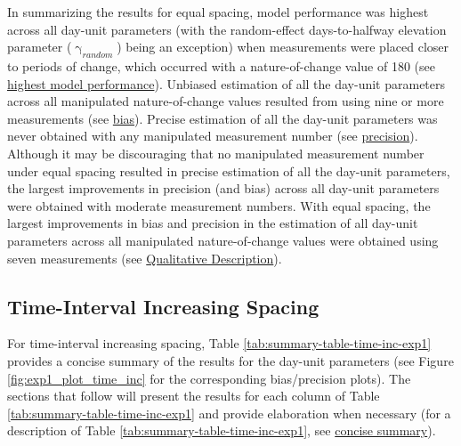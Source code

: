 \documentclass[
12pt, %
twoside,
english]{guelphthesis}
\begin{document}
In summarizing the results for equal spacing, model performance was highest across all day-unit parameters (with the random-effect days-to-halfway elevation parameter (\(\upgamma_{random}\)) being an exception) when measurements were placed closer to periods of change, which occurred with a nature-of-change value of 180 (see \protect\hyperlink{nature-change-equal-exp1}{highest model performance}). Unbiased estimation of all the day-unit parameters across all manipulated nature-of-change values resulted from using nine or more measurements (see \protect\hyperlink{bias-equal-exp1}{bias}). Precise estimation of all the day-unit parameters was never obtained with any manipulated measurement number (see \protect\hyperlink{precision-equal-exp1}{precision}). Although it may be discouraging that no manipulated measurement number under equal spacing resulted in precise estimation of all the day-unit parameters, the largest improvements in precision (and bias) across all day-unit parameters were obtained with moderate measurement numbers. With equal spacing, the largest improvements in bias and precision in the estimation of all day-unit parameters across all manipulated nature-of-change values were obtained using seven measurements (see \protect\hyperlink{qualitative-equal-exp1}{Qualitative Description}).

\hypertarget{time-interval-increasing-spacing}{%
\subsection{Time-Interval Increasing Spacing}\label{time-interval-increasing-spacing}}

For time-interval increasing spacing, Table \ref{tab:summary-table-time-inc-exp1} provides a concise summary of the results for the day-unit parameters (see Figure \ref{fig:exp1_plot_time_inc} for the corresponding bias/precision plots). The sections that follow will present the results for each column of Table \ref{tab:summary-table-time-inc-exp1} and provide elaboration when necessary (for a description of Table \ref{tab:summary-table-time-inc-exp1}, see \protect\hyperlink{concise-tab}{concise summary}).
\end{document}
